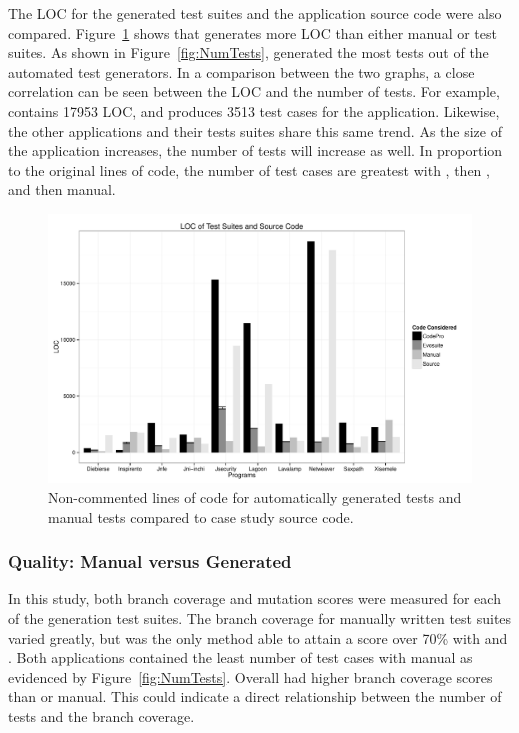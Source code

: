 

The LOC for the generated test suites and the application source code were also compared. Figure~\ref{fig:LOC} shows that \codepro generates more LOC than either manual or \evo test suites. As shown in Figure~\ref{fig:NumTests}, \codepro generated the most tests out of the automated test generators. In a comparison between the two graphs, a close correlation can be seen between the LOC and the number of tests. For example, \netweaver contains 17953 LOC, and \codepro produces 3513 test cases for the application. Likewise, the other applications and their tests suites share this same trend. As the size of the application increases, the number of tests will increase as well. In proportion to the original lines of code, the number of test cases are greatest with \codepro, then \evo, and then manual. 
 



\begin{figure}[!t]
\centering
  \includegraphics[scale=0.4]{RGraphs/LOC.pdf}
    \caption{Non-commented lines of code for automatically generated tests and manual tests compared to case study source code. }
  \label{fig:LOC}
\end{figure}


\subsubsection{Quality: Manual versus Generated}
In this study, both branch coverage and mutation scores were measured for each of the generation test suites. The branch coverage for manually written test suites varied greatly, but was the only method  able to attain a score over 70\% with \lavalamp and \xisemele. Both applications contained the least number of test cases with manual as evidenced by  Figure~\ref{fig:NumTests}. Overall \codepro had higher branch coverage scores than \evo or manual. This could indicate a direct relationship between the number of tests and the branch coverage. 

